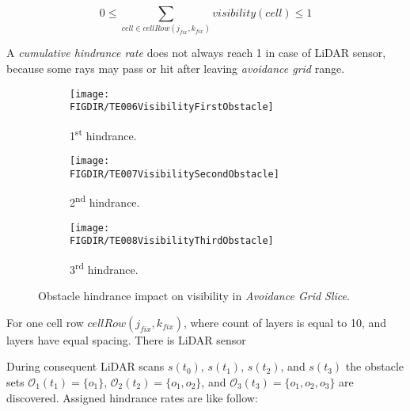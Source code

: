 \begin{equation}
    0 \le \sum_{cell\in cell Row(j_{fix},k_{fix})} visibility(cell) \le 1
\end{equation}

\begin{note}
    A \emph{cumulative hindrance rate} does not always reach 1 in case of LiDAR sensor, because some rays may pass or hit after leaving \emph{avoidance grid} range.
\end{note}


\begin{figure}[H]
    \centering
    \begin{subfigure}{0.32\textwidth}
        \texttt{[image: \\FIGDIR/TE006VisibilityFirstObstacle]} 
        \caption{1\textsuperscript{st} hindrance.}
        \label{fig:fistObstacleHindrance}
    \end{subfigure}
    \begin{subfigure}{0.32\textwidth}
        \texttt{[image: \\FIGDIR/TE007VisibilitySecondObstacle]} 
        \caption{2\textsuperscript{nd} hindrance.}
        \label{fig:secondObstacleHindrance}
    \end{subfigure}
    \begin{subfigure}{0.32\textwidth}
        \texttt{[image: \\FIGDIR/TE008VisibilityThirdObstacle]} 
        \caption{3\textsuperscript{rd} hindrance.}
        \label{fig:thirdObstacleHindrance}
    \end{subfigure}
    \caption{Obstacle hindrance impact on visibility in \emph{Avoidance Grid Slice}.}
    \label{fig:hindranceImpactOnVisibility}
\end{figure}

\noindent For one cell row $cell Row(j_{fix},k_{fix})$, where count of layers is equal to 10, and layers have equal spacing. There is LiDAR sensor

\noindent During consequent LiDAR scans $s(t_0)$, $s(t_1)$, $s(t_2)$, and $s(t_3)$ the obstacle sets $\mathscr{O}_1(t_1)=\{o_1\}$, $\mathscr{O}_2(t_2)=\{o_1,o_2\}$, and $\mathscr{O}_3(t_3)=\{o_1,o_2,o_3\}$ are discovered. Assigned hindrance rates are like follow:

